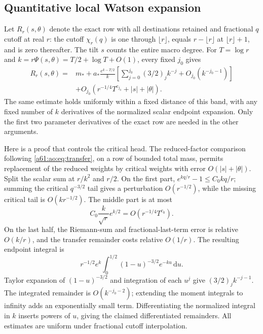 \documentclass[11pt,letterpaper]{article}
\numberwithin{equation}{section}
\theoremstyle{remark}\newtheorem{remark}[theorem]{Remark}
\newcommand{\dd}{\,\mathrm d}
\begin{document}
\subsection{Quantitative local Watson expansion}
Let $R_r(s,\theta)$ denote the exact row with all destinations retained
and fractional $q$ cutoff at real $r$: the cutoff $\chi_r(q)$ is one
through $\lfloor r\rfloor$, equals $r-\lfloor r\rfloor$ at
$\lfloor r\rfloor+1$, and is zero thereafter. The tilt $s$ counts the
entire macro degree. For $T=\log r$ and
$k=r\Psi(s,\theta)=T/2+\log T+O(1)$, every fixed $j_0$ gives
\begin{equation}\label{a61:ao:eq:Watson}
 \begin{split}
 R_r(s,\theta)={}&m_*+
 a_*\frac{e^{k-T/2}}k
 \left[\sum_{j=0}^{j_0}(3/2)_jk^{-j}+O_{j_0}(k^{-j_0-1})\right]\\
 &+O_{j_0}(r^{-1/4}T^{c_{j_0}}+|s|+|\theta|).
 \end{split}
\end{equation}
The same estimate holds uniformly within a fixed distance of this
band, with any fixed number of $k$ derivatives of the normalized
scalar endpoint expansion. Only the first two parameter derivatives
of the exact row are needed in the other arguments.

Here is a proof that controls the critical head. The reduced-factor
comparison following \eqref{a61:ao:eq:transfer}, on a row of bounded total
mass, permits replacement of the reduced weights by critical weights
with error $O(|s|+|\theta|)$. Split the scalar sum at $r/k^2$ and
$r/2$. On the first part, $e^{kq/r}-1\le C_0kq/r$; summing the
critical $q^{-3/2}$ tail gives a perturbation $O(r^{-1/2})$, while the
missing critical tail is $O(kr^{-1/2})$. The middle part is at most
\[
 C_0\frac{k}{\sqrt r}e^{k/2}=O(r^{-1/4}T^{c_0}).
\]
On the last half, the Riemann-sum and fractional-last-term error is
relative $O(k/r)$, and the transfer remainder costs relative $O(1/r)$.
The resulting endpoint integral is
\[
 r^{-1/2}e^k\int_0^{1/2}(1-u)^{-3/2}e^{-ku}\dd u.
\]
Taylor expansion of $(1-u)^{-3/2}$ and integration of each $u^j$ give
$(3/2)_j k^{-j-1}$. The integrated remainder is $O(k^{-j_0-2})$;
extending the moment integrals to infinity adds an exponentially
small term. Differentiating the normalized integral in $k$ inserts
powers of $u$, giving the claimed differentiated remainders. All
estimates are uniform under fractional cutoff interpolation.
\end{document}
